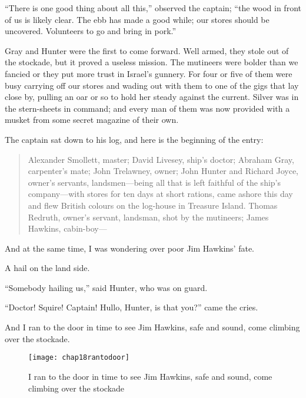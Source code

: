 \enquote{There is one good thing about all this,} observed the captain; \enquote{the wood in front of us is likely clear. The ebb has made a good while; our stores should be uncovered. Volunteers to go and bring in pork.}

Gray and Hunter were the first to come forward. Well armed, they stole out of the stockade, but it proved a useless mission. The mutineers were bolder than we fancied or they put more trust in Israel’s gunnery. For four or five of them were busy carrying off our stores and wading out with them to one of the gigs that lay close by, pulling an oar or so to hold her steady against the current. Silver was in the stern-sheets in command; and every man of them was now provided with a musket from some secret magazine of their own.

The captain sat down to his log, and here is the beginning of the entry:
\begin{quote}
Alexander Smollett, master; David Livesey, ship’s doctor; Abraham Gray, carpenter’s mate; John Trelawney, owner; John Hunter and Richard Joyce, owner’s servants, landsmen---being all that is left faithful of the ship’s company---with stores for ten days at short rations, came ashore this day and flew British colours on the log-house in Treasure Island. Thomas Redruth, owner’s servant, landsman, shot by the mutineers; James Hawkins, cabin-boy---
\end{quote}

And at the same time, I was wondering over poor Jim Hawkins’ fate.

A hail on the land side.

\enquote{Somebody hailing us,} said Hunter, who was on guard.

\enquote{Doctor! Squire! Captain! Hullo, Hunter, is that you?} came the cries.

And I ran to the door in time to see Jim Hawkins, safe and sound, come climbing over the stockade.


  \begin{figure}[p]
\centering
\texttt{[image: chap18rantodoor]}
\caption[Jim Hawkins, safe and sound]{I ran to the door in time to see Jim Hawkins, safe and sound, come climbing over the stockade}
\end{figure} 